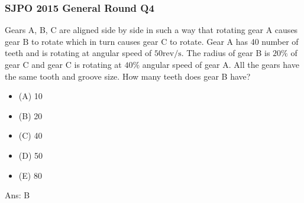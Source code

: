 \documentclass{article}
\begin{document}
\subsubsection{SJPO 2015 General Round Q4}
Gears A, B, C are aligned side by side in such a way that rotating gear A causes gear $\mathrm{B}$ to rotate which in turn causes gear $\mathrm{C}$ to rotate. Gear A has 40 number of teeth and is rotating at angular speed of $50 \mathrm{rev} / \mathrm{s}$. The radius of gear B is $20 \%$ of gear $\mathrm{C}$ and gear $\mathrm{C}$ is rotating at $40 \%$ angular speed of gear $\mathrm{A}$. All the gears have the same tooth and groove size. How many teeth does gear B have?
\begin{itemize}
\item[] (A) 10
\item[] (B) 20
\item[] (C) 40
\item[] (D) 50
\item[] (E) 80
\end{itemize}
Ans: \ifpaper B \fi
\end{document}
